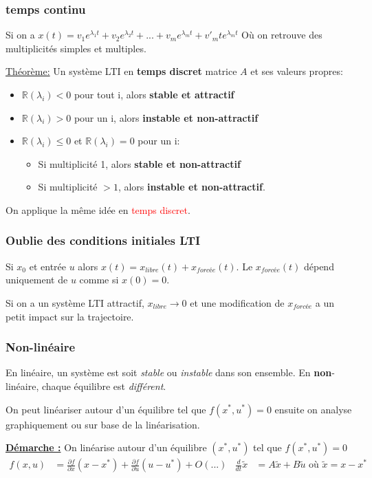 \documentclass{report}
\begin{document}
\subsubsection{temps continu}
Si on a $x(t) = v_1 e^{\lambda_1 t} +v_2 e^{\lambda_2 t} + ... + v_m e^{\lambda_m t} + v'_m t e^{\lambda_m t}$ Où on retrouve des multiplicités simples et multiples. \par 
\underline{Théorème:} Un système LTI en \textbf{temps discret} matrice $A$ et ses valeurs propres:
\begin{itemize}
\item $\mathbb{R}(\lambda_i) < 0$ pour tout i, alors \textbf{stable et attractif}
\item $\mathbb{R} (\lambda_i) > 0$ pour un i, alors \textbf{instable et non-attractif}
\item $\mathbb{R}(\lambda_i) \leqslant 0$ et $\mathbb{R}(\lambda_i)=0$ pour un i:
\begin{itemize}
\item Si multiplicité 1, alors \textbf{stable et non-attractif} 
\item Si multiplicité $>1$, alors \textbf{instable et non-attractif}.
\end{itemize}
\end{itemize}
On applique la même idée en \textcolor{red}{temps discret}.
\subsubsection{Oublie des conditions initiales LTI}
Si $x_0$ et entrée $u$ alors $x(t) = x_{libre}(t) + x_{forcée}(t)$. Le $x_{forcée}(t)$ dépend uniquement de $u$ comme si $x(0) = 0$.\par 
Si on a un système LTI attractif, $x_{libre} \rightarrow 0$ et une modification de $x_{forcée}$ a un petit impact sur la trajectoire.

\subsubsection{Non-linéaire}
En linéaire, un système est soit \textit{stable} ou \textit{instable} dans son ensemble. En \textbf{non}-linéaire, chaque équilibre est \textit{différent}.\par 
On peut linéariser autour d'un équilibre tel que $f(x^{\ast}, u^{\ast}) = 0$ ensuite on analyse graphiquement ou sur base de la linéarisation.\par
\underline{\textbf{Démarche :}} On linéarise autour d'un équilibre $(x^{\ast}, u^{\ast})$ tel que $f(x^{\ast}, u^{\ast}) =0$
\begin{align*}
f(x,u) &= \frac{\partial f}{\partial x} (x-x^{\ast}) +\frac{\partial f}{\partial u} (u - u^{\ast}) + O(...) & \frac{d}{dt} \tilde{x} &= A \tilde{x} + B \tilde{u} \text{ où } \tilde{x} = x - x^{\ast}
\end{align*}
\end{document}
